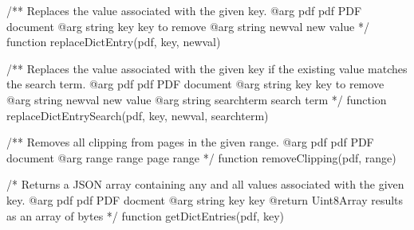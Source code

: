 /** Replaces the value associated with the given key.
@arg {pdf} pdf PDF document
@arg {string} key key to remove
@arg {string} newval new value */
function replaceDictEntry(pdf, key, newval) {}

/** Replaces the value associated with the given key if the existing value
matches the search term.
@arg {pdf} pdf PDF document
@arg {string} key key to remove
@arg {string} newval new value
@arg {string} searchterm search term */
function replaceDictEntrySearch(pdf, key, newval, searchterm) {}

/** Removes all clipping from pages in the given range.
@arg {pdf} pdf PDF document
@arg {range} range page range */
function removeClipping(pdf, range) {}

/* Returns a JSON array containing any and all values associated with the
given key.
@arg {pdf} pdf PDF docment
@arg {string} key key
@return {Uint8Array} results as an array of bytes */
function getDictEntries(pdf, key) {}
